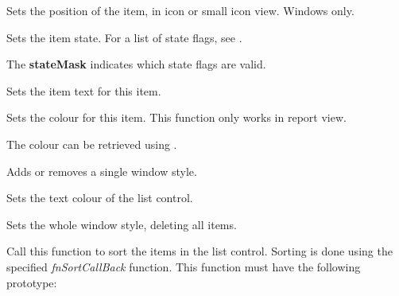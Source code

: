 Sets the position of the item, in icon or small icon view. Windows only.


\label{wxlistctrlsetitemstate}


Sets the item state. For a list of state flags, see .

The {\bf stateMask} indicates which state flags are valid.


\label{wxlistctrlsetitemtext}


Sets the item text for this item.


\label{wxlistctrlsetitemtextcolour}


Sets the colour for this item. This function only works in report view.

The colour can be retrieved using
.


\label{wxlistctrlsetsinglestyle}


Adds or removes a single window style.


\label{wxlistctrlsettextcolour}


Sets the text colour of the list control.


\label{wxlistctrlsetwindowstyleflag}


Sets the whole window style, deleting all items.

\label{wxlistctrlsortitems}


Call this function to sort the items in the list control. Sorting is done
using the specified {\it fnSortCallBack} function. This function must have the
following prototype:

